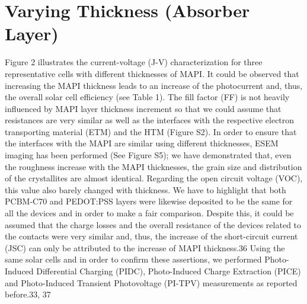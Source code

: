 \section{Varying  Thickness (Absorber Layer)}

Figure 2 illustrates the current-voltage (J-V) characterization for three representative cells with different thicknesses of MAPI. It could be observed that increasing the MAPI thickness leads to an increase of the photocurrent and, thus, the overall solar cell efficiency (see Table 1). The fill factor (FF) is not heavily influenced by MAPI layer thickness increment so that we could assume that resistances are very similar as well as the interfaces with the respective electron transporting material (ETM) and the HTM (Figure S2). In order to ensure that the interfaces with the MAPI are similar using different thicknesses, ESEM imaging has been performed (See Figure S5); we have demonstrated that, even the roughness increase with the MAPI thicknesses, the grain size and distribution of the crystallites are almost identical.
Regarding the open circuit voltage (VOC), this value also barely changed with thickness. We have to highlight that both PCBM-C70 and PEDOT:PSS layers were likewise deposited to be the same for all the devices and in order to make a fair comparison. Despite this, it could be assumed that the charge losses and the overall resistance of the devices related to the contacts were very similar and, thus, the increase of the short-circuit current (JSC) can only be attributed to the increase of MAPI thickness.36 Using the same solar cells and in order to confirm these assertions, we performed Photo-Induced Differential Charging (PIDC), Photo-Induced Charge Extraction (PICE) and Photo-Induced Transient Photovoltage (PI-TPV) measurements as reported before.33, 37

